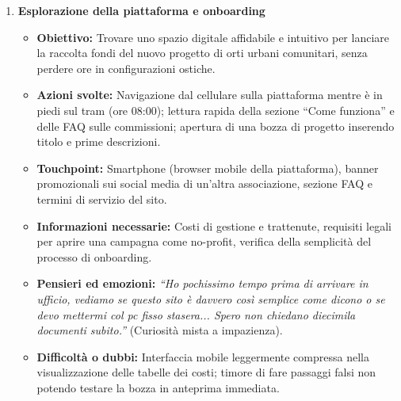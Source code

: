 \documentclass[11pt,a4paper]{article}
\begin{document}
    \begin{enumerate}

        \item \textbf{Esplorazione della piattaforma e onboarding}
        \begin{itemize}
            \item \textbf{Obiettivo:} Trovare uno spazio digitale affidabile e intuitivo per lanciare la raccolta fondi del nuovo progetto di orti urbani comunitari, senza perdere ore in configurazioni ostiche.
            \item \textbf{Azioni svolte:} Navigazione dal cellulare sulla piattaforma mentre è in piedi sul tram (ore 08:00); lettura rapida della sezione ``Come funziona'' e delle FAQ sulle commissioni; apertura di una bozza di progetto inserendo titolo e prime descrizioni.
            \item \textbf{Touchpoint:} Smartphone (browser mobile della piattaforma), banner promozionali sui social media di un'altra associazione, sezione FAQ e termini di servizio del sito.
            \item \textbf{Informazioni necessarie:} Costi di gestione e trattenute, requisiti legali per aprire una campagna come no-profit, verifica della semplicità del processo di onboarding.
            \item \textbf{Pensieri ed emozioni:} \textit{``Ho pochissimo tempo prima di arrivare in ufficio, vediamo se questo sito è davvero così semplice come dicono o se devo mettermi col pc fisso stasera... Spero non chiedano diecimila documenti subito.''} (Curiosità mista a impazienza).
            \item \textbf{Difficoltà o dubbi:} Interfaccia mobile leggermente compressa nella visualizzazione delle tabelle dei costi; timore di fare passaggi falsi non potendo testare la bozza in anteprima immediata.
        \end{itemize}


\end{enumerate}
\end{document}
